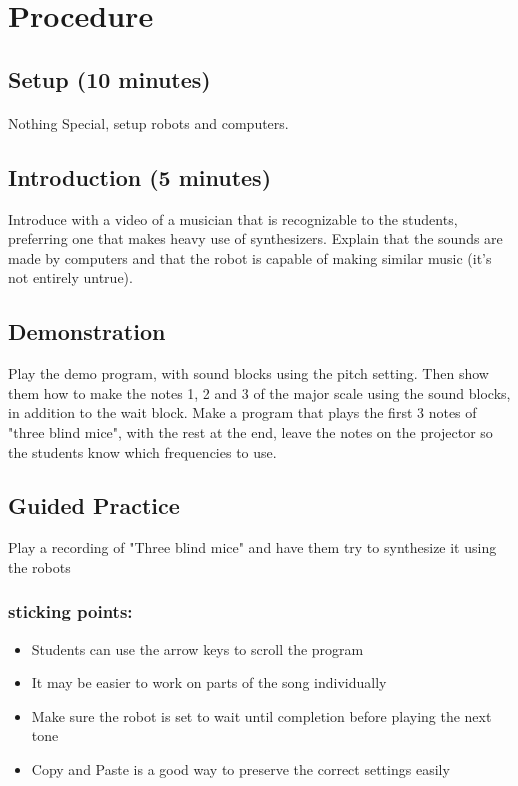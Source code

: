 \documentclass{lessonplan}
\begin{document}
  \section{Procedure}
    \subsection{Setup (10 minutes)}
      \paragraph{}
      Nothing Special, setup robots and computers.
    \subsection{Introduction (5 minutes)}
      Introduce with a video of a musician that is recognizable to the
      students, preferring one that makes heavy use of synthesizers.
      Explain that the sounds are made by computers and that the robot
      is capable of making similar music (it's not entirely untrue).
    \subsection{Demonstration}
      Play the demo program, with sound blocks using the pitch
      setting.  Then show them how to make the notes 1, 2 and 3 of the
      major scale using the sound blocks, in addition to the wait
      block.  Make a program that plays the first 3 notes of "three
      blind mice", with the rest at the end, leave the notes on the
      projector so the students know which frequencies to use.
    \subsection{Guided Practice}
      Play a recording of "Three blind mice" and have them try to
      synthesize it using the robots
      \subsubsection{sticking points:}
      \begin{itemize}
        \item Students can use the arrow keys to scroll the program
        \item It may be easier to work on parts of the song
          individually
        \item Make sure the robot is set to wait until completion
          before playing the next tone
        \item Copy and Paste is a good way to preserve the correct
          settings easily
      \end{itemize}
\end{document}
